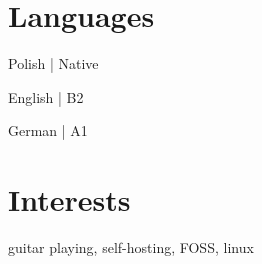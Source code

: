 \documentclass{article}
\newcommand\VRule{\color{lightgray}\vrule width 0.5pt}
\begin{document}


\section*{Languages}
\begin{minipage}[ht]{.3\textwidth}
\centering
Polish | Native
\end{minipage}
\begin{minipage}[ht]{.3\textwidth}
\centering
English | B2
\end{minipage}
\begin{minipage}[ht]{.3\textwidth}
\centering
German | A1
\end{minipage}


\section*{Interests}
guitar playing, self-hosting, FOSS, linux
\end{document}
